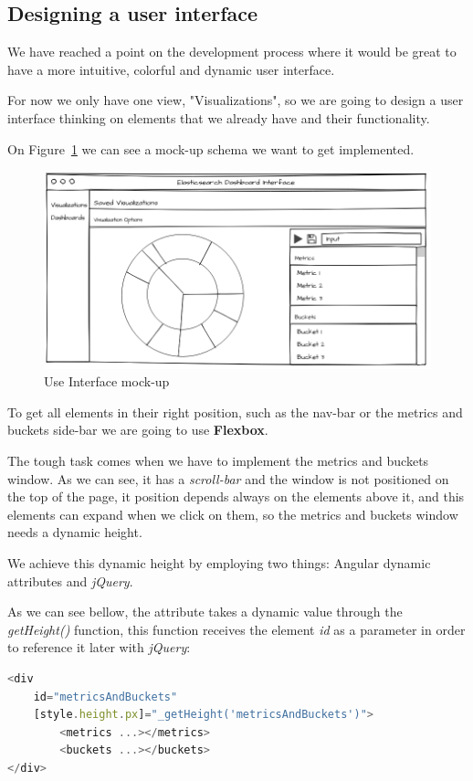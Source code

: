 \documentclass[a4paper, 12pt, english]{book}
\begin{document}
\subsection{Designing a user interface}
\label{sec:pie-chart}

We have reached a point on the development process where it would be great to have a more intuitive, colorful and dynamic user interface.

For now we only have one view,  "Visualizations", so we are going to design a user interface thinking on elements that we already have and their functionality.

On Figure~\ref{fig:user-interface-mockup} we can see a mock-up schema we want to get implemented.
\begin{figure}
  \centering
  \includegraphics[width=15cm, keepaspectratio]{img/user_interface_mockup}
  \caption{Use Interface mock-up}
  \label{fig:user-interface-mockup}
\end{figure}

To get all elements in their right position, such as the nav-bar or the metrics and buckets side-bar we are going to use \textbf{Flexbox}.

The tough task comes when we have to implement the metrics and buckets window. As we can see, it has a \textit{scroll-bar} and the window is not positioned on the top of the page, it position depends always on the elements above it, and this elements can expand when we click on them, so the metrics and buckets window needs a dynamic height.

We achieve this dynamic height by employing two things: Angular dynamic attributes and \textit{jQuery}.

As we can see bellow, the attribute takes a dynamic value through the \textit{getHeight()} function, this function receives the element \textit{id} as a parameter in order to reference it later with \textit{jQuery}:
\begin{lstlisting}[language=javascript, caption=Dynamic height with Angular, label=code:angular-dynamic-heigh]
<div
    id="metricsAndBuckets"
    [style.height.px]="_getHeight('metricsAndBuckets')">
        <metrics ...></metrics>
        <buckets ...></buckets>
</div>
\end{lstlisting}
\end{document}
